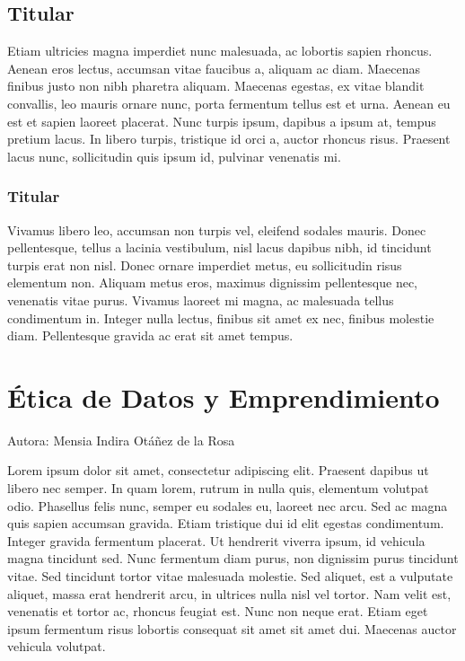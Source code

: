 \documentclass[
  letterpaper,
  DIV=11,
  numbers=noendperiod]{scrreprt}
\begin{document}
\hypertarget{titular-6}{%
\section{Titular}\label{titular-6}}

Etiam ultricies magna imperdiet nunc malesuada, ac lobortis sapien
rhoncus. Aenean eros lectus, accumsan vitae faucibus a, aliquam ac diam.
Maecenas finibus justo non nibh pharetra aliquam. Maecenas egestas, ex
vitae blandit convallis, leo mauris ornare nunc, porta fermentum tellus
est et urna. Aenean eu est et sapien laoreet placerat. Nunc turpis
ipsum, dapibus a ipsum at, tempus pretium lacus. In libero turpis,
tristique id orci a, auctor rhoncus risus. Praesent lacus nunc,
sollicitudin quis ipsum id, pulvinar venenatis mi.

\hypertarget{titular-7}{%
\subsection{Titular}\label{titular-7}}

Vivamus libero leo, accumsan non turpis vel, eleifend sodales mauris.
Donec pellentesque, tellus a lacinia vestibulum, nisl lacus dapibus
nibh, id tincidunt turpis erat non nisl. Donec ornare imperdiet metus,
eu sollicitudin risus elementum non. Aliquam metus eros, maximus
dignissim pellentesque nec, venenatis vitae purus. Vivamus laoreet mi
magna, ac malesuada tellus condimentum in. Integer nulla lectus, finibus
sit amet ex nec, finibus molestie diam. Pellentesque gravida ac erat sit
amet tempus.


\hypertarget{uxe9tica-de-datos-y-emprendimiento}{%
\chapter{Ética de Datos y
Emprendimiento}\label{uxe9tica-de-datos-y-emprendimiento}}

Autora: Mensia Indira Otáñez de la Rosa

Lorem ipsum dolor sit amet, consectetur adipiscing elit. Praesent
dapibus ut libero nec semper. In quam lorem, rutrum in nulla quis,
elementum volutpat odio. Phasellus felis nunc, semper eu sodales eu,
laoreet nec arcu. Sed ac magna quis sapien accumsan gravida. Etiam
tristique dui id elit egestas condimentum. Integer gravida fermentum
placerat. Ut hendrerit viverra ipsum, id vehicula magna tincidunt sed.
Nunc fermentum diam purus, non dignissim purus tincidunt vitae. Sed
tincidunt tortor vitae malesuada molestie. Sed aliquet, est a vulputate
aliquet, massa erat hendrerit arcu, in ultrices nulla nisl vel tortor.
Nam velit est, venenatis et tortor ac, rhoncus feugiat est. Nunc non
neque erat. Etiam eget ipsum fermentum risus lobortis consequat sit amet
sit amet dui. Maecenas auctor vehicula volutpat.
\end{document}
